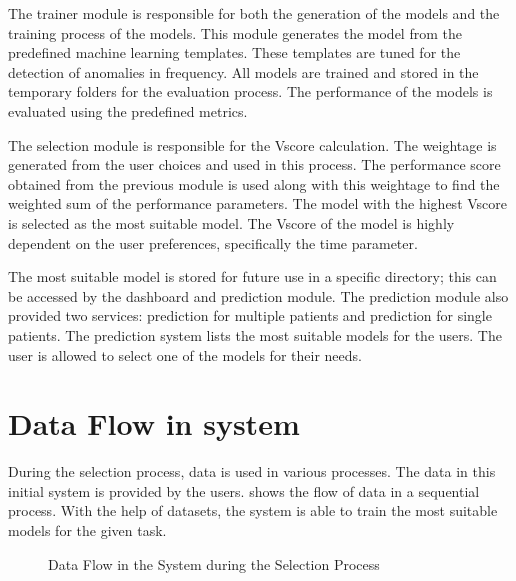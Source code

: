 The trainer module is responsible for both the generation of the models and the training process of the models. This module generates the model from the predefined machine learning templates. These templates are tuned for the detection of anomalies in frequency. All models are trained and stored in the temporary folders for the evaluation process. The performance of the models is evaluated using the predefined metrics.

The selection module is responsible for the Vscore calculation. The weightage is generated from the user choices and used in this process. The performance score obtained from the previous module is used along with this weightage to find the weighted sum of the performance parameters. The model with the highest Vscore is selected as the most suitable model. The Vscore of the model is highly dependent on the user preferences, specifically the time parameter.

The most suitable model is stored for future use in a specific directory; this can be accessed by the dashboard and prediction module. The prediction module also provided two services: prediction for multiple patients and prediction for single patients. The prediction system lists the most suitable models for the users. The user is allowed to select one of the models for their needs.

\section{Data Flow in system}

During the selection process, data is used in various processes. The data in this initial system is provided by the users.  shows the flow of data in a sequential process. With the help of datasets, the system is able to train the most suitable models for the given task.

\begin{figure}[ht]
  \centering
  \caption{Data Flow in the System during the Selection Process}
  \label{flow:data_flow_in_system_selection}
\end{figure}

